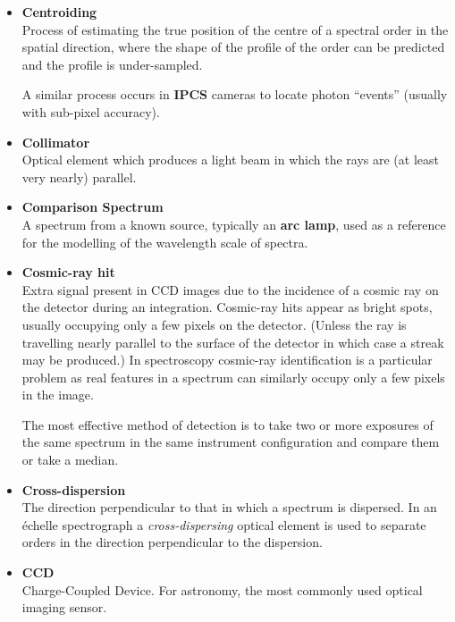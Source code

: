 \documentclass[twoside,11pt]{article}
\newcommand{\htmlref}[2]{#1}
\begin{document}
\begin{itemize}
\item {\bf\label{gl_centroiding}Centroiding}\\
      Process of estimating the true position of the centre of a spectral
      order in the spatial direction, where the shape of the profile of
      the order can be predicted and the profile is under-sampled.

      A similar process occurs in \htmlref{{\bf IPCS}}{gl_ipcs} cameras to
      locate photon ``events'' (usually with sub-pixel accuracy).

\item {\bf\label{gl_collimator}Collimator}\\
      Optical element which produces a light beam in which the rays
      are (at least very nearly) parallel.

\item {\bf\label{gl_comparison}Comparison Spectrum}\\
      A spectrum from a known source, typically an
      \htmlref{{\bf arc lamp}}{gl_arc},
      used as a reference for the modelling of the wavelength scale of
      spectra.

\item {\bf\label{gl_cosmic_ray}Cosmic-ray hit}\\
      Extra signal present in CCD images due to the incidence of a cosmic
      ray on the detector during an integration.  Cosmic-ray hits appear
      as bright spots, usually occupying only a few pixels on the detector.
      (Unless the ray is travelling nearly parallel to the surface of the
      detector in which case a streak may be produced.)
      In spectroscopy cosmic-ray identification is a particular problem
      as real features in a spectrum can similarly occupy only a few pixels
      in the image.

      The most effective method of detection is to take
      two or more exposures of the same spectrum in the same instrument
      configuration and compare them or take a median.

\item {\bf\label{gl_cross_dispersion}Cross-dispersion}\\
      The direction perpendicular to that in which a spectrum is
      dispersed.  In an \'{e}chelle spectrograph a {\sl cross-dispersing}
      optical element is used to separate orders in the
      direction perpendicular to the dispersion.

\item {\bf\label{gl_ccd}CCD}\\
      Charge-Coupled Device.   For astronomy, the most commonly used
      optical imaging sensor.


\end{itemize}
\end{document}
